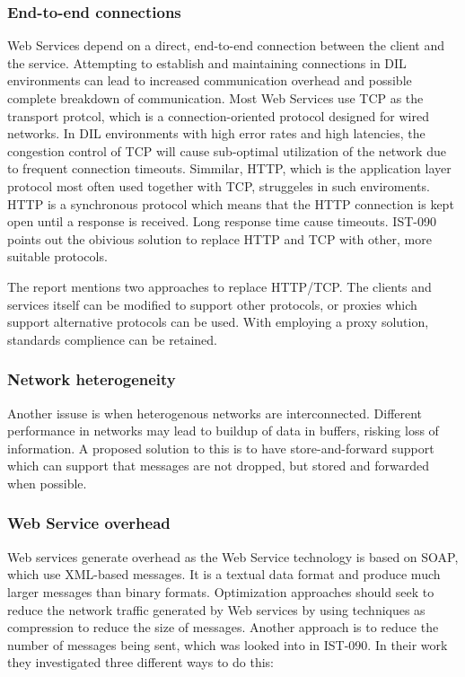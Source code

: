 \documentclass[USenglish]{ifimaster}
\begin{document}
\label{section:DIL-problems}

\subsubsection{End-to-end connections}

Web Services depend on a direct, end-to-end connection between the client and
the service. Attempting to establish and maintaining connections in DIL
environments can lead to increased communication overhead and possible complete
breakdown of communication. Most Web Services use TCP as the transport protcol,
which is a connection-oriented protocol designed for wired networks. In DIL
environments with high error rates and high latencies, the congestion control of
TCP will cause sub-optimal utilization of the network due to frequent connection
timeouts. Simmilar, HTTP, which is the application layer protocol most often
used together with TCP, struggeles in such enviroments. HTTP is a synchronous
protocol which means that the HTTP connection is kept open until a response is
received. Long response time cause timeouts. IST-090 points out the obivious
solution to replace HTTP and TCP with other, more suitable protocols.

The report mentions two approaches to replace HTTP/TCP. The clients and services
itself can be modified to support other protocols, or proxies which support
alternative protocols can be used. With employing a proxy solution, standards
complience can be retained.


\subsubsection{Network heterogeneity}

Another issuse is when heterogenous networks are interconnected. Different
performance in networks may lead to buildup of data in buffers, risking loss of
information. A proposed solution to this is to have store-and-forward support
which can support that messages are not dropped, but stored and forwarded when
possible.


\subsubsection{Web Service overhead}

Web services generate overhead as the Web Service technology is based on SOAP,
which use XML-based messages. It is a textual data format and produce much
larger messages than binary formats. Optimization approaches should seek to
reduce the network traffic generated by Web services by using techniques as
compression to reduce the size of messages. Another approach is to reduce the
number of messages being sent, which was looked into in IST-090\cite{ist-090}. In
their work they investigated three different ways to do this:
\end{document}

